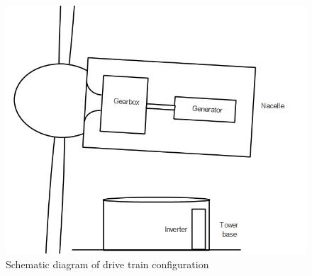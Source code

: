 \begin{figure}[H]
    \centering
    \includegraphics[width=1\textwidth]{Images/Drive_train_sketch.jpg}
    \caption{Schematic diagram of drive train configuration}
    \label{fig:eddie's art}
\end{figure}


